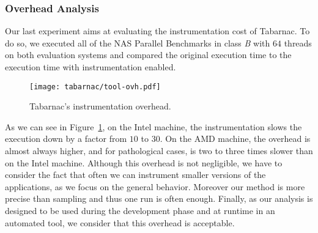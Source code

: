 \subsubsection{Overhead Analysis}

Our last experiment aims at evaluating the instrumentation cost of \gls{Tabarnac}. To do so, we
executed all of the NAS Parallel Benchmarks in class \emph{B} with $64$
threads on both evaluation systems and compared the original execution time to the execution time with instrumentation enabled.

\begin{figure}[!htb]
    \centering
    \texttt{[image: tabarnac/tool-ovh.pdf]}
    \caption{\gls{Tabarnac}'s instrumentation overhead.}
    \label{fig:ovh}
\end{figure}


As we can see in Figure~\ref{fig:ovh}, on the Intel machine,
the instrumentation slows the execution down by a factor from $10$ to $30$.
On the AMD machine, the overhead is almost always higher, and for
pathological cases, is two to three times slower than on
the Intel machine.
Although this overhead is not negligible, we have to consider the fact that often we can instrument
smaller versions of the applications, as we focus on the general behavior.
Moreover our method is more precise than sampling and
thus one run is often enough. Finally, as our
analysis is designed to be used during the development phase and at runtime in an
automated tool, we consider that this overhead is acceptable.


